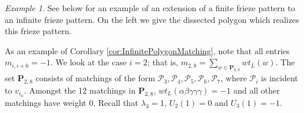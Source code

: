 \documentclass[12pt]{article}
\theoremstyle{remark}
\newtheorem{example}{Example}
\newcommand*{\pathset}[2]{\mathbf{P}_{#1,#2}}
\newcommand*{\poly}[1]{\mathcal{P}_{#1}}
\begin{document}
\begin{example}\label{ex:InfinitePolygon}
See below for an example of an extension of a finite frieze pattern to an infinite frieze pattern. On the left we give the dissected polygon which realizes this frieze pattern.

 
 As an example of Corollary \ref{cor:InfinitePolygonMatching}, note that all entries $m_{i,i+6} = -1$. We look at the case $i=2$; that is, $m_{2,8} = \sum_{w \in \pathset{2}{8}} wt_L(w)$.  The set $\pathset{2}{8}$ consists of matchings of the form $\poly{3},\poly{4},\poly{5},\poly{6},\poly{7}$, where $\poly{i}$ is incident to $v_{i_n}$. Amongst the 12 matchings in $\pathset{2}{8}$, $wt_L(\alpha\beta\gamma\gamma\gamma) = -1$ and all other matchings have weight 0. Recall that $\lambda_3 = 1$, $U_2(1) = 0$ and $U_3(1) = -1$. 
 

\end{example}
\end{document}
